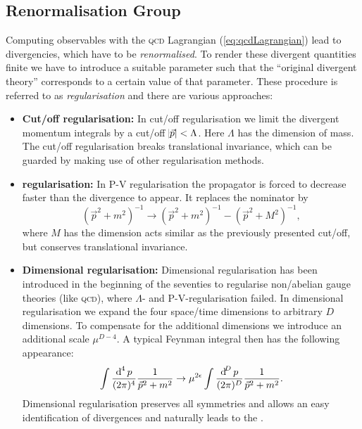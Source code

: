 \documentclass[../../index.tex]{subfiles}
\begin{document}
\subsection{Renormalisation Group}
Computing observables with the \textsc{qcd} Lagrangian (\cref{eq:qcdLagrangian})
lead to divergencies, which have to be \textit{renormalised}. To render these
divergent quantities finite we have to introduce a suitable parameter such
that the ``original divergent theory'' corresponds to a certain value of that
parameter. These procedure is referred to as \textit{regularisation} and there
are various approaches:
\begin{itemize}
\item \label{itm:lambdaRegularisation}\textbf{Cut\-/off regularisation:} In
  cut\-/off regularisation we limit the divergent momentum integrals by a
  cut\-/off \(\abs{\vec p} < \Lambda\). Here \(\Lambda\) has the dimension of
  mass. The cut\-/off regularisation breaks translational invariance, which can
  be guarded by making use of other regularisation methods.
\item \textbf{ regularisation:} \cite{Pauli1949}
  In \textsc{P-V} regularisation the propagator is forced to decrease faster
  than the divergence to appear. It replaces the nominator by
  \begin{equation}
    (\vec p^2 + m^2)^{-1} \to (\vec p^2 + m^2)^{-1} - (\vec p^2 + M^2)^{-1},
  \end{equation}
  where \(M\) has the dimension acts similar as the previously presented
  cut\-/off, but conserves translational invariance.
\item \textbf{Dimensional regularisation:}
  \cite{Bollini1972,tHooft1972,tHooft1973} Dimensional regularisation has been
  introduced in the beginning of the seventies to regularise non\-/abelian gauge
  theories (like \textsc{qcd}), where \(\Lambda\)- and
  \textsc{P-V}-regularisation failed. In dimensional regularisation we expand
  the four space\-/time dimensions to arbitrary \(D\) dimensions. To compensate
  for the additional dimensions we introduce an additional scale \(\mu^{D-4}\).
  A typical Feynman integral then has the following appearance:
  \begin{equation}
    \label{eq:dimRegFeynmanIntegral}
    \int \fdif{p} \frac{1}{\vec p^2 + m^2} \to \mu^{2\epsilon} \int \frac{\dif^D p}{(2\pi)^D}\frac{1}{\vec p^2+m^2}.
  \end{equation}
  Dimensional regularisation preserves all symmetries and allows an easy
  identification of divergences and naturally leads to the  \cite{tHooft1973,Weinberg1973a}.
\end{itemize}
\end{document}
